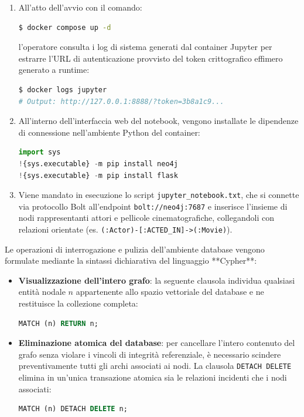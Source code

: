 \documentclass[11pt, a4paper]{article}
\begin{document}
\begin{enumerate}
    \item All'atto dell'avvio con il comando:
\begin{lstlisting}[language=bash]
$ docker compose up -d
\end{lstlisting}
    l'operatore consulta i log di sistema generati dal container Jupyter per estrarre l'URL di autenticazione provvisto del token crittografico effimero generato a runtime:
\begin{lstlisting}[language=bash]
$ docker logs jupyter
# Output: http://127.0.0.1:8888/?token=3b8a1c9...
\end{lstlisting}
    \item All'interno dell'interfaccia web del notebook, vengono installate le dipendenze di connessione nell'ambiente Python del container:
\begin{lstlisting}[language=python]
import sys
!{sys.executable} -m pip install neo4j
!{sys.executable} -m pip install flask
\end{lstlisting}
    \item Viene mandato in esecuzione lo script \texttt{jupyter\_notebook.txt}, che si connette via protocollo Bolt all'endpoint \texttt{bolt://neo4j:7687} e inserisce l'insieme di nodi rappresentanti attori e pellicole cinematografiche, collegandoli con relazioni orientate (es. \texttt{(:Actor)-[:ACTED\_IN]->(:Movie)}).
\end{enumerate}

Le operazioni di interrogazione e pulizia dell'ambiente database vengono formulate mediante la sintassi dichiarativa del linguaggio **Cypher**:
\begin{itemize}
    \item \textbf{Visualizzazione dell'intero grafo}: la seguente clausola individua qualsiasi entità nodale $n$ appartenente allo spazio vettoriale del database e ne restituisce la collezione completa:
\begin{lstlisting}[language=sql]
MATCH (n) RETURN n;
\end{lstlisting}
    \item \textbf{Eliminazione atomica del database}: per cancellare l'intero contenuto del grafo senza violare i vincoli di integrità referenziale, è necessario scindere preventivamente tutti gli archi associati ai nodi. La clausola \texttt{DETACH DELETE} elimina in un'unica transazione atomica sia le relazioni incidenti che i nodi associati:
\begin{lstlisting}[language=sql]
MATCH (n) DETACH DELETE n;
\end{lstlisting}
\end{itemize}
\end{document}
